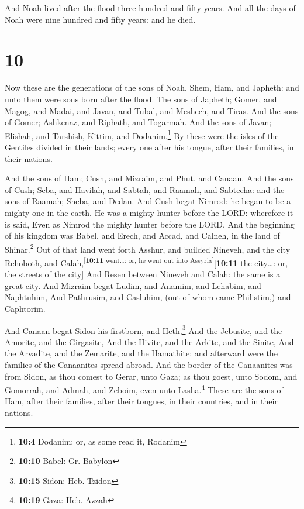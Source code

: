  And Noah lived after the flood three hundred and fifty
years.  And all the days of Noah were nine hundred and
fifty years: and he died.

\hypertarget{section-9}{%
\section{10}\label{section-9}}

 Now these are the generations of the sons of Noah, Shem,
Ham, and Japheth: and unto them were sons born after the flood.
 The sons of Japheth; Gomer, and Magog, and Madai, and
Javan, and Tubal, and Meshech, and Tiras.  And the sons of
Gomer; Ashkenaz, and Riphath, and Togarmah.  And the sons
of Javan; Elishah, and Tarshish, Kittim, and Dodanim.\footnote{\textbf{10:4}
  Dodanim: or, as some read it, Rodanim}  By these were
the isles of the Gentiles divided in their lands; every one after his
tongue, after their families, in their nations.

 And the sons of Ham; Cush, and Mizraim, and Phut, and
Canaan.  And the sons of Cush; Seba, and Havilah, and
Sabtah, and Raamah, and Sabtecha: and the sons of Raamah; Sheba, and
Dedan.  And Cush begat Nimrod: he began to be a mighty one
in the earth.  He was a mighty hunter before the LORD:
wherefore it is said, Even as Nimrod the mighty hunter before the LORD.
 And the beginning of his kingdom was Babel, and Erech,
and Accad, and Calneh, in the land of Shinar.\footnote{\textbf{10:10}
  Babel: Gr. Babylon}  Out of that land went forth
Asshur, and builded Nineveh, and the city Rehoboth, and
Calah,\textsuperscript{{[}\textbf{10:11} went\ldots: or, he went out
into Assyria{]}}{[}\textbf{10:11} the city\ldots: or, the streets of the
city{]}  And Resen between Nineveh and Calah: the same is
a great city.  And Mizraim begat Ludim, and Anamim, and
Lehabim, and Naphtuhim,  And Pathrusim, and Casluhim,
(out of whom came Philistim,) and Caphtorim.

 And Canaan begat Sidon his firstborn, and
Heth,\footnote{\textbf{10:15} Sidon: Heb. Tzidon}  And
the Jebusite, and the Amorite, and the Girgasite,  And
the Hivite, and the Arkite, and the Sinite,  And the
Arvadite, and the Zemarite, and the Hamathite: and afterward were the
families of the Canaanites spread abroad.  And the border
of the Canaanites was from Sidon, as thou comest to Gerar, unto Gaza; as
thou goest, unto Sodom, and Gomorrah, and Admah, and Zeboim, even unto
Lasha.\footnote{\textbf{10:19} Gaza: Heb. Azzah}  These
are the sons of Ham, after their families, after their tongues, in their
countries, and in their nations.

